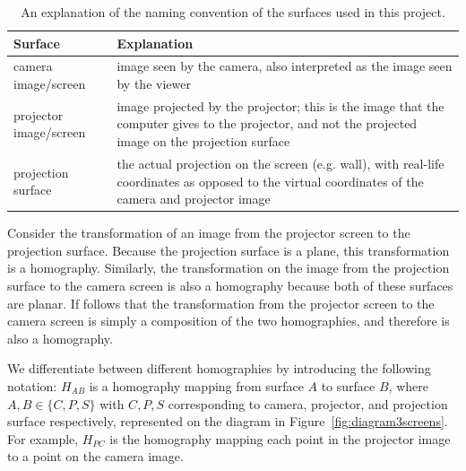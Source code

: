 \documentclass[11pt, oneside, reqno]{book}
\begin{document}
\begin{table}[h]
	\begin{center}
		\begin{tabular}{| l | p{10cm} |}
			\hline
			\textbf{Surface} & \textbf{Explanation} \\
			\hline
			camera image/screen & image seen by the camera, also interpreted as the image seen by the viewer \\
			\hline
			projector image/screen & image projected by the projector; this is the image that the computer gives to the projector, and not the projected image on the projection surface \\
			\hline
			projection surface & the actual projection on the screen (e.g. wall), with real-life coordinates as opposed to the virtual coordinates of the camera and projector image \\
			\hline
		\end{tabular}
	\end{center}
	\caption{An explanation of the naming convention of the surfaces used in this project.}
	\label{table:basicModelSurfaces}
\end{table}


Consider the transformation of an image from the projector screen to the projection surface. Because the projection surface is a plane, this transformation is a homography. Similarly, the transformation on the image from the projection surface to the camera screen is also a homography because both of these surfaces are planar. If follows that the transformation from the projector screen to the camera screen is simply a composition of the two homographies, and therefore is also a homography. 

We differentiate between different homographies by introducing the following notation: $H_{AB}$ is a homography mapping from surface $A$ to surface $B$, where $A,B\in \{ C, P, S \}$ with $C, P, S$ corresponding to camera, projector, and projection surface respectively, represented on the diagram in Figure~\ref{fig:diagram3screens}. For example, $H_{PC}$ is the homography mapping each point in the projector image to a point on the camera image.
\end{document}

